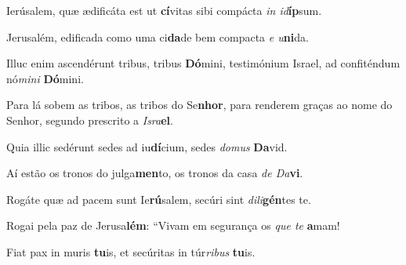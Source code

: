 \begin{greenumerate}
  \setcounter{enumi}{2}

  \item Ierúsalem, quæ ædificáta est ut \textbf{cí}vitas {\GreStar} sibi compácta \textit{in id}\textbf{íp}sum. 

  \switchcolumn\setcounter{enumi}{2}

  \item Jerusalém, edificada como uma ci\textbf{da}de {\GreStar} bem compacta \textit{e u}\textbf{ni}da. 

  \switchcolumn*

  \item Illuc enim ascendérunt tribus, tribus \textbf{Dó}mini, {\GreStar} testimónium Israel, ad confiténdum nó\textit{mini} \textbf{Dó}mini. 

  \switchcolumn%

  \item Para lá sobem as tribos, as tribos do Se\textbf{nhor}, {\GreStar} para renderem graças ao nome do Senhor, segundo prescrito a \textit{Isra}\textbf{el}. 

  \switchcolumn*

  \item Quia illic sedérunt sedes ad iu\textbf{dí}cium, {\GreStar} sedes \textit{domus} \textbf{Da}vid. 

  \switchcolumn%

  \item Aí estão os tronos do julga\textbf{men}to, {\GreStar} os tronos da casa \textit{de Da}\textbf{vi}. 

  \switchcolumn*

  \item Rogáte quæ ad pacem sunt Ie\textbf{rú}salem, {\GreStar} secúri sint \textit{dili}\textbf{gén}tes te. 

  \switchcolumn%

  \item Rogai pela paz de Jerusa\textbf{lém}: {\GreStar} ``Vivam em segurança os \textit{que te} \textbf{a}mam! 

  \switchcolumn*

  \item Fiat pax in muris \textbf{tu}is, {\GreStar} et secúritas in túr\textit{ribus} \textbf{tu}is. 


\end{greenumerate}
